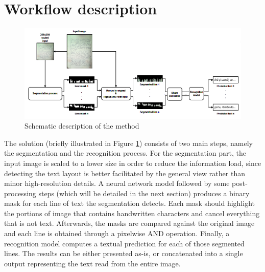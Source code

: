 \section{Workflow description}

\begin{figure}[htbp]
    \centering
        \includegraphics[scale=0.6]{figures/workflow_diagram.png}
    \caption{Schematic description of the method}
    \label{FigWorkflow}        
\end{figure}

The solution (briefly illustrated in Figure \ref{FigWorkflow}) consists of two main steps, namely the segmentation and the recognition process. For the segmentation part, the input image is scaled to a lower size in order to reduce the information load, since detecting the text layout is better facilitated by the general view rather than minor high-resolution details. A neural network model followed by some post-processing steps (which will be detailed in the next section) produces a binary mask for each line of text the segmentation detects. Each mask should highlight the portions of image that contains handwritten characters and cancel everything that is not text. Afterwards, the masks are compared against the original image and each line is obtained through a pixelwise AND operation. Finally, a recognition model computes a textual prediction for each of those segmented lines. The results can be either presented as-is, or concatenated into a single output representing the text read from the entire image.
